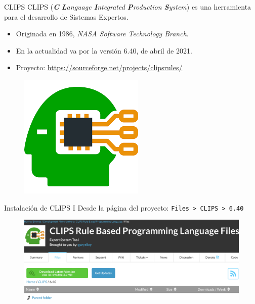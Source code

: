 \documentclass[usenames,dvipsnames,aspectratio=169]{beamer}
\begin{document}
\begin{frame}{CLIPS}
	CLIPS (\textit{\textbf{C} \textbf{L}anguage \textbf{I}ntegrated \textbf{P}roduction \textbf{S}ystem}) es una herramienta para el desarrollo de Sistemas Expertos.
	\begin{itemize}
		\item Originada en 1986, \textit{NASA Software Technology Branch}.
		\item En la actualidad va por la versión 6.40, de abril de 2021.
		\item Proyecto: \url{https://sourceforge.net/projects/clipsrules/}
	\end{itemize}
	\begin{figure}
		\includegraphics[width=0.3\linewidth]{graphics/clips_logo.png}
	\end{figure}
\end{frame}

\begin{frame}{Instalación de CLIPS I}
	Desde la página del proyecto: \texttt{Files > CLIPS > 6.40}
	\begin{figure}
		\includegraphics[width=.7\linewidth]{graphics/clips_descarga.png}
	\end{figure}
\end{frame}
\end{document}
